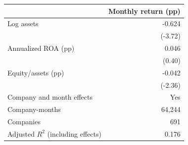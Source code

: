 \begin{tabular}{lr}
\toprule
 & Monthly return (pp) \\
\midrule
Log assets & -0.624 \\
 & (-3.72) \\
Annualized ROA (pp) & 0.046 \\
 & (0.40) \\
Equity/assets (pp) & -0.042 \\
 & (-2.36) \\
Company and month effects & Yes \\
Company-months & 64,244 \\
Companies & 691 \\
Adjusted $R^2$ (including effects) & 0.176 \\
\bottomrule
\end{tabular}
